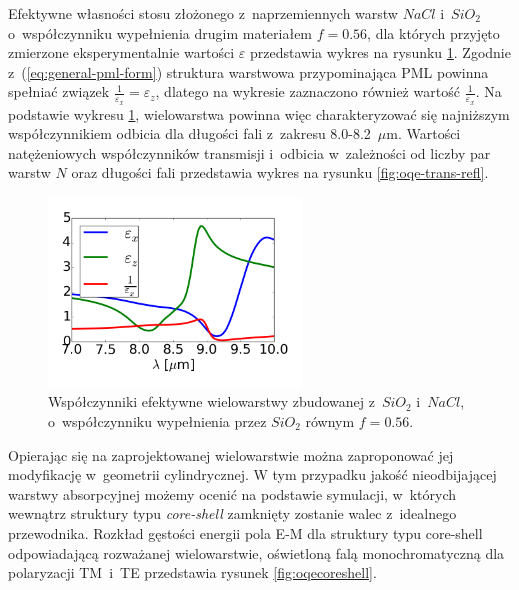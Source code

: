 Efektywne własności stosu złożonego z~naprzemiennych warstw $NaCl$ i~$SiO_2$ o~współczynniku wypełnienia drugim materiałem $f=0.56$, dla których przyjęto zmierzone eksperymentalnie wartości $\varepsilon$ przedstawia wykres na rysunku \ref{fig:eff-pml-real}. Zgodnie z~(\ref{eq:general-pml-form}) struktura warstwowa przypominająca PML powinna spełniać związek $\frac{1}{\varepsilon_x}=\varepsilon_z$, dlatego na wykresie zaznaczono również wartość $\frac{1}{\varepsilon_x}$. Na podstawie wykresu \ref{fig:eff-pml-real}, wielowarstwa powinna więc charakteryzować się najniższym współczynnikiem odbicia dla długości fali z~zakresu 8.0-8.2~$\mu$m. Wartości natężeniowych współczynników transmisji i~odbicia w~zależności od liczby par warstw $N$ oraz długości fali przedstawia wykres na rysunku \ref{fig:oqe-trans-refl}.

\begin{figure}
	\includegraphics[width=0.6\textwidth]{images/pml/effepsilon-nacl-sio2.png}
	\caption{Współczynniki efektywne wielowarstwy zbudowanej z~$SiO_2$ i~$NaCl$, o~współczynniku wypełnienia przez $SiO_2$ równym $f=0.56$.}
	\label{fig:eff-pml-real}
\end{figure}

Opierając się na zaprojektowanej wielowarstwie można zaproponować jej modyfikację w~geometrii cylindrycznej. W tym przypadku jakość nieodbijającej warstwy absorpcyjnej możemy ocenić na podstawie symulacji, w~których wewnątrz struktury typu \textit{core-shell} zamknięty zostanie walec z~idealnego przewodnika. Rozkład gęstości energii pola E-M dla struktury typu core-shell odpowiadającą rozważanej wielowarstwie, oświetloną falą monochromatyczną dla polaryzacji TM~i~TE przedstawia rysunek \ref{fig:oqecoreshell}.

